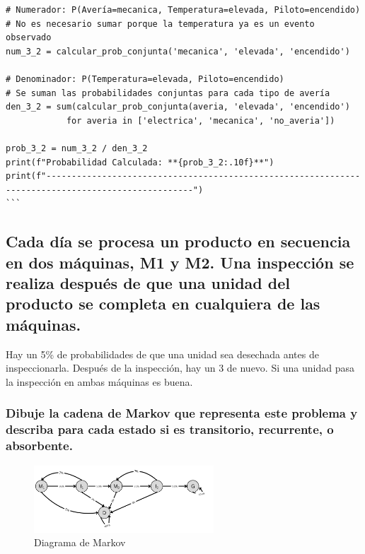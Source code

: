 \documentclass[11pt]{article}
\begin{document}
\begin{tcolorbox}[breakable, size=fbox, boxrule=1pt, pad at break*=1mm, colback=cellbackground, colframe=cellborder]
\begin{Verbatim}[commandchars=\\\{\}]
# Numerador: P(Avería=mecanica, Temperatura=elevada, Piloto=encendido)
# No es necesario sumar porque la temperatura ya es un evento observado
num_3_2 = calcular_prob_conjunta('mecanica', 'elevada', 'encendido')

# Denominador: P(Temperatura=elevada, Piloto=encendido)
# Se suman las probabilidades conjuntas para cada tipo de avería
den_3_2 = sum(calcular_prob_conjunta(averia, 'elevada', 'encendido')
            for averia in ['electrica', 'mecanica', 'no_averia'])

prob_3_2 = num_3_2 / den_3_2
print(f"Probabilidad Calculada: **{prob_3_2:.10f}**")
print(f"---------------------------------------------------------------------------------------------------")
```
\end{Verbatim}
\end{tcolorbox}

    \hypertarget{Cada maq}{%
\subsection{Cada día se procesa un producto en secuencia en dos máquinas, M1 y M2. Una inspección se realiza después de que una unidad del producto se completa en cualquiera de las máquinas. }\label{Cada maq}}

Hay un 5\% de probabilidades de que una unidad sea desechada antes de inspeccionarla. Después de la inspección, hay un 3%
de nuevo. Si una unidad pasa la inspección en ambas máquinas es
buena.

\subsubsection{Dibuje la cadena de Markov que representa este problema y describa para cada estado si es transitorio, recurrente, o absorbente.}

\begin{figure}[H]
    \centering
    \includegraphics[width=0.6\textwidth]{Markov.png}
    \caption{Diagrama de Markov}
    \label{fig:Markdown}
\end{figure}
\end{document}
